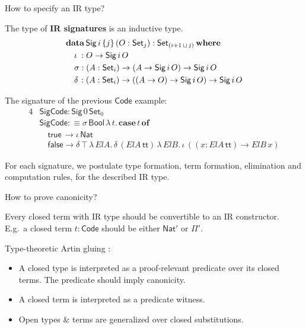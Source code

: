 \documentclass[dvipsnames,aspectratio=169]{beamer}
\newcommand{\ms}[1]{\mathsf{#1}}
\newcommand{\mbf}[1]{\mathbf{#1}}
\newcommand{\data}{\mbf{data}}
\newcommand{\Set}{\ms{Set}}
\newcommand{\where}{\mbf{where}}
\newcommand{\Nat}{\ms{Nat}}
\newcommand{\Sig}{\ms{Sig}}
\newcommand{\Code}{\ms{Code}}
\newcommand{\case}{\mbf{case}}
\newcommand{\of}{\mbf{of}}
\newcommand{\ttt}{\ms{tt}}
\newcommand{\Bool}{\ms{Bool}}
\newcommand{\true}{\ms{true}}
\newcommand{\false}{\ms{false}}
\begin{document}
\begin{frame}{How to specify an IR type?}

The type of \textbf{IR signatures} is an inductive type.
\vspace{-0.5em}
\begin{alignat*}{4}
  &\data\, \Sig\,i\,\{j\}\,(O : \Set_j) : \Set_{(i+1\,\sqcup\,j)}\,\where\\
  &\quad \iota\hspace{0.25em}  : O \to \Sig\,i\,O \\
  &\quad \sigma               : (A : \Set_i) \to (A \to \Sig\,i\,O) \to \Sig\,i\,O \\
  &\quad \delta\hspace{0.1em} : (A : \Set_i) \to ((A \to O) \to \Sig\,i\,O) \to \Sig\,i\,O
\end{alignat*}

The signature of the previous $\ms{Code}$ example:
\begin{alignat*}{4}
  & \ms{SigCode} : \Sig\,0\,\Set_0\\
  & \ms{SigCode} :\equiv \sigma\,\Bool\,\lambda\,t.\,\case\,t\,\of \\
  & \quad \true  \,\to \iota\,\Nat \\
  & \quad \false \to \delta\,\top\,\lambda\,{ElA}.\, \delta\,({ElA}\,\ttt)\,\lambda\,{ElB}.\,
      \iota\, ((x : {ElA}\,\ttt) \to {ElB}\,x)
\end{alignat*}

For each signature, we postulate type formation, term formation, elimination and computation rules,
for the described IR type.

\end{frame}


\begin{frame}{How to prove canonicity?}

Every closed term with IR type should be convertible to an IR constructor.
E.g.\ a closed term $t : \Code$ should be either $\Nat'$ or $\Pi'$.
\vspace{1em}

Type-theoretic Artin gluing \cite{coquand2018canonicity,gluing}:
\begin{itemize}
  \item A closed type is interpreted as a proof-relevant predicate over its closed terms.
        The predicate should imply canonicity.
  \item A closed term is interpreted as a predicate witness.
  \item Open types \& terms are generalized over closed substitutions.
\end{itemize}


\end{frame}
\end{document}
